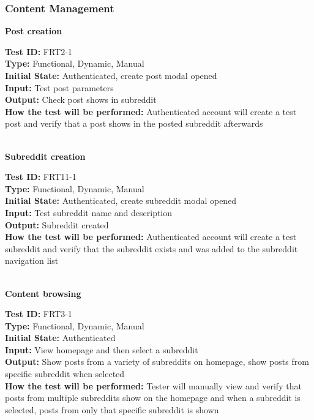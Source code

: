 \documentclass[12pt,fleqn]{article}
\begin{document}
\subsubsection{Content Management}

\textbf{Post creation}
\begin{tcolorbox}
\textbf{Test ID:} FRT2-1\\
\textbf{Type:} Functional, Dynamic, Manual\\
\textbf{Initial State:} Authenticated, create post modal opened\\
\textbf{Input:} Test post parameters\\
\textbf{Output:} Check post shows in subreddit\\
\textbf{How the test will be performed:} Authenticated account will create a test post and verify that a post shows in the posted subreddit afterwards
\end{tcolorbox}

\textbf{\\Subreddit creation}
\begin{tcolorbox}
\textbf{Test ID:} FRT11-1\\ %
\textbf{Type:} Functional, Dynamic, Manual\\
\textbf{Initial State:} Authenticated, create subreddit modal opened\\
\textbf{Input:} Test subreddit name and description\\
\textbf{Output:} Subreddit created\\
\textbf{How the test will be performed:} Authenticated account will create a test subreddit and verify that the subreddit exists and was added to the subreddit navigation list
\end{tcolorbox}

\newpage

\textbf{\\Content browsing}
\begin{tcolorbox}
\textbf{Test ID:} FRT3-1\\
\textbf{Type:} Functional, Dynamic, Manual\\
\textbf{Initial State:} Authenticated\\
\textbf{Input:} View homepage and then select a subreddit\\
\textbf{Output:} Show posts from a variety of subreddits on homepage, show posts from specific subreddit when selected\\
\textbf{How the test will be performed:} Tester will manually view and verify that posts from multiple subreddits show on the homepage and when a subreddit is selected, posts from only that specific subreddit is shown
\end{tcolorbox}
\end{document}
